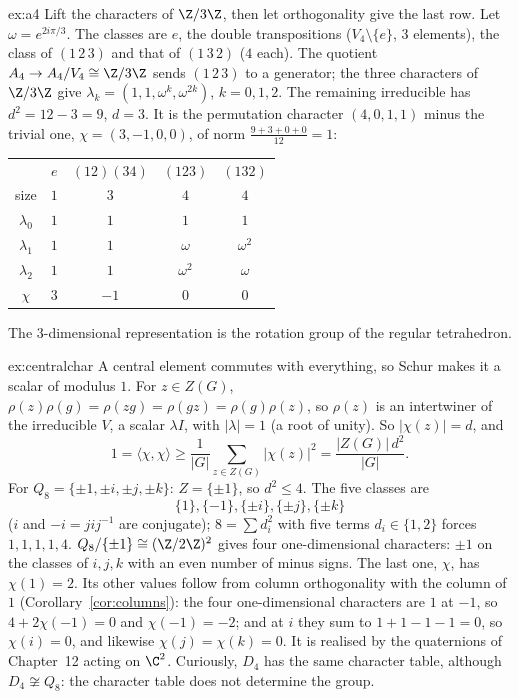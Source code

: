 \begin{solution}{ex:a4}
\idea Lift the characters of $\Z/3\Z$, then let orthogonality give the last row.
\writeup Let $\omega=e^{2i\pi/3}$. The classes are $e$, the double transpositions ($V_4\setminus\{e\}$, $3$ elements), the class of $(1\,2\,3)$ and that of $(1\,3\,2)$ ($4$ each). The quotient $A_4\to A_4/V_4\cong\Z/3\Z$ sends $(1\,2\,3)$ to a generator; the three characters of $\Z/3\Z$ give $\lambda_k=(1,1,\omega^k,\omega^{2k})$, $k=0,1,2$. The remaining irreducible has $d^2=12-3=9$, $d=3$. It is the permutation character $(4,0,1,1)$ minus the trivial one, $\chi=(3,-1,0,0)$, of norm $\frac{9+3+0+0}{12}=1$:
\begin{center}
\small
\begin{tabular}{c|cccc}
& $e$ & $(12)(34)$ & $(123)$ & $(132)$\\
size & $1$ & $3$ & $4$ & $4$\\\hline
$\lambda_0$ & $1$ & $1$ & $1$ & $1$\\
$\lambda_1$ & $1$ & $1$ & $\omega$ & $\omega^2$\\
$\lambda_2$ & $1$ & $1$ & $\omega^2$ & $\omega$\\
$\chi$ & $3$ & $-1$ & $0$ & $0$
\end{tabular}
\end{center}
The $3$-dimensional representation is the rotation group of the regular tetrahedron.
\end{solution}

\begin{solution}{ex:centralchar}
\idea A central element commutes with everything, so Schur makes it a scalar of modulus $1$.
\writeup For $z\in Z(G)$, $\rho(z)\rho(g)=\rho(zg)=\rho(gz)=\rho(g)\rho(z)$, so $\rho(z)$ is an intertwiner of the irreducible $V$, a scalar $\lambda I$, with $|\lambda|=1$ (a root of unity). So $|\chi(z)|=d$, and
\[
1=\langle\chi,\chi\rangle\ge\frac1{|G|}\sum_{z\in Z(G)}|\chi(z)|^2=\frac{|Z(G)|\,d^2}{|G|}.
\]
For $Q_8=\{\pm1,\pm i,\pm j,\pm k\}$: $Z=\{\pm1\}$, so $d^2\le4$. The five classes are
\[
\{1\},\{-1\},\{\pm i\},\{\pm j\},\{\pm k\}
\]
($i$ and $-i=jij^{-1}$ are conjugate); $8=\sum d_i^2$ with five terms $d_i\in\{1,2\}$ forces $1,1,1,1,4$. $Q_8/\{\pm1\}\cong(\Z/2\Z)^2$ gives four one-dimensional characters: $\pm1$ on the classes of $i,j,k$ with an even number of minus signs. The last one, $\chi$, has $\chi(1)=2$. Its other values follow from column orthogonality with the column of $1$ (Corollary~\ref{cor:columns}): the four one-dimensional characters are $1$ at $-1$, so $4+2\chi(-1)=0$ and $\chi(-1)=-2$; and at $i$ they sum to $1+1-1-1=0$, so $\chi(i)=0$, and likewise $\chi(j)=\chi(k)=0$. It is realised by the quaternions of Chapter~12 acting on $\C^2$. Curiously, $D_4$ has the same character table, although $D_4\not\cong Q_8$: the character table does not determine the group.
\end{solution}

